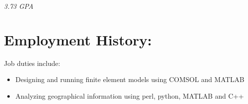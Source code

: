 \documentclass{resume}
\begin{document}
    
    
        \emph{ 3.73 GPA}\\
    


\begin{comment}

New section, trying it out
Currently canning this section but THAT'S OKAY
\section*{\underline{\textit{Projects:}}}
\large\textit{Super Four-Bar Explorer \hfill December 2008}\normalsize
\small\begin{itemize}
\item A program written in python that uses a Gauss-Newton unconstrained optimization algorithm to fit the path traced by a four bar linkage to a given set of points
\item Accompanied by a spreadsheet that illustrates four-bar linkage traced paths
\end{itemize}\normalsize\medskip

Another new section, recommended by Career Services. At worst, I have the
wording for it, amirite?
\section*{\underline{\textit{Service:}}}
\tiny\begin{enumerate}
\item Administered the web site and Facebook page for ASME's UAF student chapter \hfill 2009--2010
\item Volunteered at the UAF College of Engineering and Mines' Engineer's Week Open House \hfill February 2010
\end{enumerate}\normalsize

\large\textit{Society of Automotive Engineers, UAF
Chapter\hfill2009}\normalsize\\
\textit{Treasurer}
\end{comment}

\section{Employment History:}


    \normalsize
    Job duties include:
    \small\begin{itemize}
    
        \item Designing and running finite element models using COMSOL and MATLAB
    
        \item Analyzing geographical information using perl, python, MATLAB and C++
    
    \end{itemize}\normalsize
\end{document}
